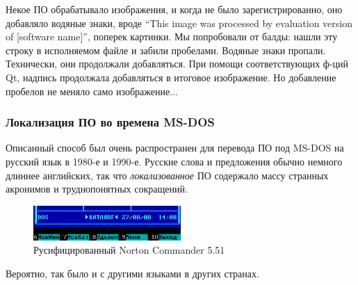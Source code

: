 Некое ПО обрабатывало изображения, и когда не было зарегистрированно, оно добавляло водяные знаки,
вроде ``This image was processed by evaluation version of [software name]'', поперек картинки.
Мы попробовали от балды: нашли эту строку в исполняемом файле и забили пробелами.
Водяные знаки пропали.
Технически, они продолжали добавляться.
При помощи соответствующих ф-ций Qt, надпись продолжала добавляться в итоговое изображение.
Но добавление пробелов не меняло само изображение...

\subsubsection{Локализация ПО во времена MS-DOS}

Описанный способ был очень распространен для перевода ПО под MS-DOS на русский язык в 1980-е и 1990-е.
Русские слова и предложения обычно немного длиннее английских, так что \emph{локализованное} ПО содержало
массу странных акронимов и труднопонятных сокращений.

\begin{figure}[H]
\centering
\includegraphics[width=0.5\textwidth]{patterns/01_helloworld/Norton_Commander_v5_51.png}
\caption{Русифицированный Norton Commander 5.51}
\end{figure}

Вероятно, так было и с другими языками в других странах.

